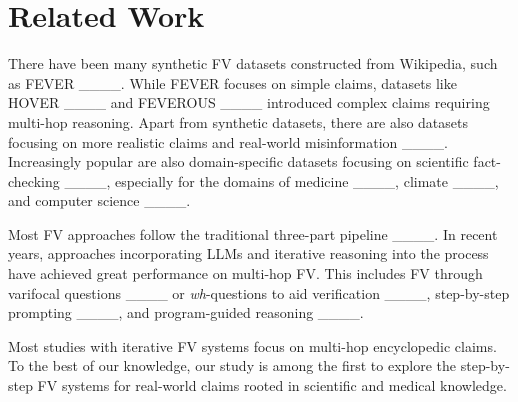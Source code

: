 \section{Related Work}
There have been many synthetic FV datasets constructed from Wikipedia, such as FEVER ____. While FEVER focuses on simple claims, datasets like 
HOVER ____ and 
FEVEROUS ____ introduced complex claims requiring multi-hop reasoning. Apart from synthetic datasets, there are also datasets focusing on more realistic claims and real-world misinformation ____. Increasingly popular are also domain-specific datasets focusing on scientific fact-checking ____, especially for the domains of medicine ____, climate ____, and computer science ____. 

Most FV approaches follow the traditional three-part pipeline ____. In recent years, approaches incorporating LLMs and iterative reasoning into the process have achieved great performance on multi-hop FV. This includes FV through varifocal questions ____ or \textit{wh}-questions to aid verification ____, step-by-step prompting ____, and program-guided reasoning ____.

Most studies with iterative FV systems focus on multi-hop encyclopedic claims. To the best of our knowledge, our study is among the first to explore the step-by-step FV systems for real-world claims rooted in scientific and medical knowledge.